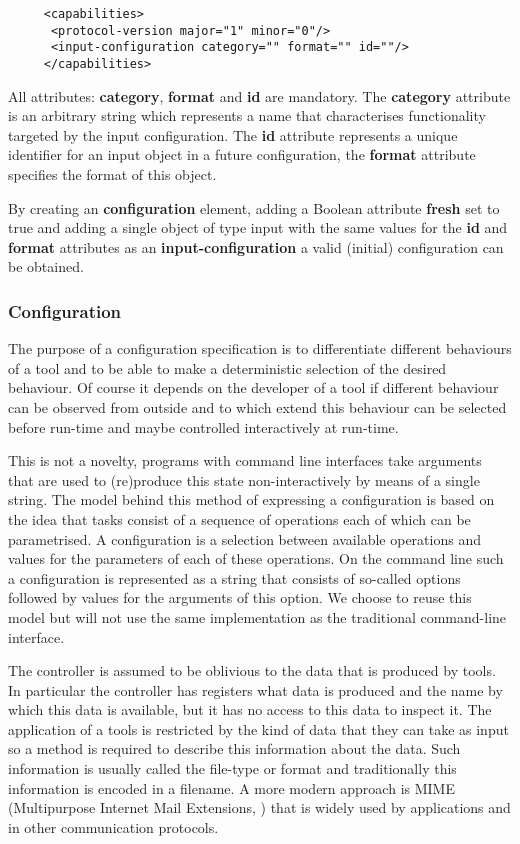 \documentclass{article}
\begin{document}
    \begin{verbatim}
     <capabilities>
      <protocol-version major="1" minor="0"/>
      <input-configuration category="" format="" id=""/>
     </capabilities>\end{verbatim}

    All attributes: \textbf{category}, \textbf{format} and \textbf{id} are
    mandatory.  The \textbf{category} attribute is an arbitrary string which
    represents a name that characterises functionality targeted by the input
    configuration. The \textbf{id} attribute represents a unique identifier for
    an input object in a future configuration, the \textbf{format} attribute
    specifies the format of this object.

    By creating an \textbf{configuration} element, adding a Boolean attribute
    \textbf{fresh} set to true and adding a single object of type input with
    the same values for the \textbf{id} and \textbf{format} attributes as an
    \textbf{input-configuration} a valid (initial) configuration can be obtained.

  \subsubsection{Configuration}

   The purpose of a configuration specification is to differentiate different
   behaviours of a tool and to be able to make a deterministic selection of the
   desired behaviour. Of course it depends on the developer of a tool if
   different behaviour can be observed from outside and to which extend this
   behaviour can be selected before run-time and maybe controlled interactively
   at run-time.

   This is not a novelty, programs with command line interfaces take arguments
   that are used to (re)produce this state non-interactively by means of a
   single string. The model behind this method of expressing a configuration is
   based on the idea that tasks consist of a sequence of operations each of
   which can be parametrised. A configuration is a selection between available
   operations and values for the parameters of each of these operations. On the
   command line such a configuration is represented as a string that consists
   of so-called options followed by values for the arguments of this option. We
   choose to reuse this model but will not use the same implementation as the
   traditional command-line interface.

   The controller is assumed to be oblivious to the data that is produced by
   tools. In particular the controller has registers what data is produced and
   the name by which this data is available, but it has no access to this data
   to inspect it. The application of a tools is restricted by the kind of data
   that they can take as input so a method is required to describe this
   information about the data. Such information is usually called the file-type
   or format and traditionally this information is encoded in a filename. A
   more modern approach is MIME (Multipurpose Internet Mail Extensions, \cite{rfc2822})
   that is widely used by applications and in other communication protocols.
\end{document}

